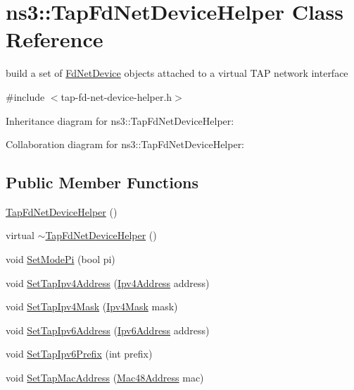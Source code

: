 \hypertarget{classns3_1_1TapFdNetDeviceHelper}{}\section{ns3\+:\+:Tap\+Fd\+Net\+Device\+Helper Class Reference}
\label{classns3_1_1TapFdNetDeviceHelper}


build a set of \hyperlink{classns3_1_1FdNetDevice}{Fd\+Net\+Device} objects attached to a virtual T\+AP network interface  




{\ttfamily \#include $<$tap-\/fd-\/net-\/device-\/helper.\+h$>$}



Inheritance diagram for ns3\+:\+:Tap\+Fd\+Net\+Device\+Helper\+:


Collaboration diagram for ns3\+:\+:Tap\+Fd\+Net\+Device\+Helper\+:
\subsection*{Public Member Functions}
\begin{DoxyCompactItemize}
\item 
\hyperlink{classns3_1_1TapFdNetDeviceHelper_a8fd2e74889845dd82ad218501fc84fe1}{Tap\+Fd\+Net\+Device\+Helper} ()
\item 
virtual \hyperlink{classns3_1_1TapFdNetDeviceHelper_ad29875a77f9624528fb62f428b3c763b}{$\sim$\+Tap\+Fd\+Net\+Device\+Helper} ()
\item 
void \hyperlink{classns3_1_1TapFdNetDeviceHelper_aa514fd85b9be3d13b2402c2dc0ac8a6d}{Set\+Mode\+Pi} (bool pi)
\item 
void \hyperlink{classns3_1_1TapFdNetDeviceHelper_aa1283be36ca8f45294ff480566994f97}{Set\+Tap\+Ipv4\+Address} (\hyperlink{classns3_1_1Ipv4Address}{Ipv4\+Address} address)
\item 
void \hyperlink{classns3_1_1TapFdNetDeviceHelper_a727c7402978ea7425cf4d4d16cb73783}{Set\+Tap\+Ipv4\+Mask} (\hyperlink{classns3_1_1Ipv4Mask}{Ipv4\+Mask} mask)
\item 
void \hyperlink{classns3_1_1TapFdNetDeviceHelper_ac908bf6fcd13070349828534ee99252c}{Set\+Tap\+Ipv6\+Address} (\hyperlink{classns3_1_1Ipv6Address}{Ipv6\+Address} address)
\item 
void \hyperlink{classns3_1_1TapFdNetDeviceHelper_a56f44b68da0b264d7927824cae50785a}{Set\+Tap\+Ipv6\+Prefix} (int prefix)
\item 
void \hyperlink{classns3_1_1TapFdNetDeviceHelper_a2446339448910b2895b5374895c57d4c}{Set\+Tap\+Mac\+Address} (\hyperlink{classns3_1_1Mac48Address}{Mac48\+Address} mac)
\end{DoxyCompactItemize}
